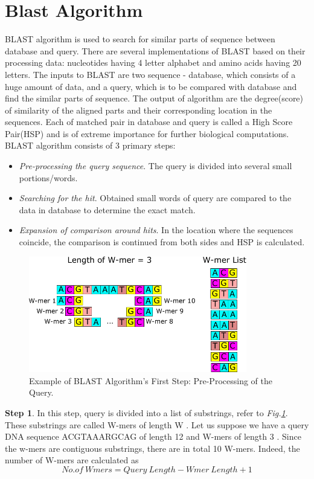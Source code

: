 \section{Blast Algorithm}
\label{sec:blast}

\quad BLAST algorithm is used to search for similar parts of sequence between database and query. There are several implementations of BLAST based on their processing data: nucleotides having 4 letter alphabet and amino acids having 20 letters. The inputs to BLAST are two sequence - database, which consists of a huge amount of data, and a query, which is to be compared with database and find the similar parts of sequence. The output of algorithm are the degree(score) of similarity of the aligned parts and their corresponding location in the sequences. Each of matched pair in database and query is called a High Score Pair(HSP) and is of extreme importance for further biological computations. BLAST algorithm consists of 3 primary steps:
\begin{itemize}
\item{\textit{Pre-processing the query sequence}. The query is divided into several small portions/words.} 
\item{\textit{Searching for the hit}. Obtained small words of query are compared to the data in database to determine the exact match.}
\item{\textit{Expansion of comparison around hits}. In the location where the sequences coincide, the comparison is continued from both sides and HSP is calculated.}
\end{itemize}

\begin{figure}[t!]
\centering
\includegraphics[width=0.85\textwidth]{Figures/Algorithm1.pdf}
\caption{Example of BLAST Algorithm's First Step: Pre-Processing of the Query.} \label{fig:step1}
\end{figure}


\textbf{Step 1}. In this step, query is divided into a list of substrings, refer to \textit{Fig.\ref{fig:step1}}. These substrings are called W-mers of length W \cite{sotiriades2007design}. Let us suppose we have a query DNA sequence ACGTAAARGCAG of length 12 and W-mers of length 3 \cite{sotiriades2007design}. Since the w-mers are contiguous substrings, there are in total 10 W-mers. Indeed, the number of W-mers are calculated as 
\begin{equation}
\label{eq1}
No.of \ Wmers = Query \ Length - Wmer \ Length + 1 
\end{equation}

